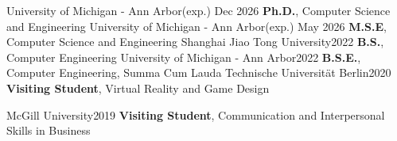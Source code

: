   \SubHeadingListStart
  
    \SubHeading
    {University of Michigan - Ann Arbor}{(exp.) Dec 2026 }
    {\textbf{Ph.D.}, Computer Science and Engineering}{}
        \ItemListStart
        \ItemListEnd
    \SubHeading
    {University of Michigan - Ann Arbor}{(exp.) May 2026 }
    {\textbf{M.S.E}, Computer Science and Engineering}{}
    \SubHeading
    {Shanghai Jiao Tong University}{2022}
    {\textbf{B.S.}, Computer Engineering}{}
    \SubHeading
    {University of Michigan - Ann Arbor}{2022}
    {\textbf{B.S.E.}, Computer Engineering, Summa Cum Lauda}{}
    \ItemListStart
    \ItemListEnd
    \SubHeadingCV
    {Technische Universität Berlin}{2020}
    {\textbf{Visiting Student}, Virtual Reality and Game Design}{}

    \SubHeadingCV
    {McGill University}{2019}
    {\textbf{Visiting Student}, Communication and Interpersonal Skills in Business}{}
        
  \SubHeadingListEnd